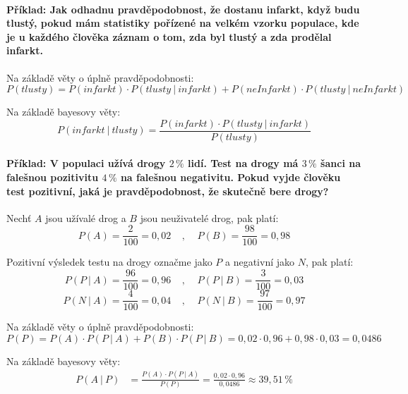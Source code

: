 \paragraph*{Příklad: Jak odhadnu pravděpodobnost, že dostanu infarkt, když budu tlustý, pokud mám statistiky pořízené na velkém vzorku populace, kde je u každého člověka záznam o tom, zda byl tlustý a zda prodělal infarkt.}

\begin{compactitem}
    \item Na základě věty o úplně pravděpodobnosti:
    $$ P(tlusty) = P(infarkt) \cdot P(tlusty ~|~ infarkt) + P(neInfarkt) \cdot P(tlusty ~|~ neInfarkt)$$

    \item Na základě bayesovy věty:
    $$ P(infarkt ~|~ tlusty) = \frac{P(infarkt) \cdot P(tlusty ~|~ infarkt)}{P(tlusty)} $$
\end{compactitem}

\paragraph*{Příklad: V populaci užívá drogy $2\,\%$ lidí. Test na drogy má $3\,\%$ šanci na falešnou pozitivitu $4\,\%$ na falešnou negativitu. Pokud vyjde člověku test pozitivní, jaká je pravděpodobnost, že skutečně bere drogy?}

\begin{compactitem}
    \item Nechť $A$ jsou užívalé drog a $B$ jsou neuživatelé drog, pak platí:
    $$ P(A) = \frac{2}{100} = 0,02 ~~~~~,~~~~~ P(B) = \frac{98}{100} = 0,98$$

    \item Pozitivní výsledek testu na drogy označme jako $P$ a negativní jako $N$, pak platí:
    $$ P(P ~|~ A) = \frac{96}{100} = 0,96 ~~~~~,~~~~~ P(P ~|~ B) = \frac{3}{100} = 0,03 $$
    $$ P(N ~|~ A) = \frac{4}{100} = 0,04 ~~~~~,~~~~~ P(N ~|~ B) = \frac{97}{100} = 0,97 $$

    \item Na základě věty o úplně pravděpodobnosti:
    $$ P(P) = P(A) \cdot P(P~|~A) + P(B) \cdot P(P~|~B) = 0,02 \cdot 0,96 + 0,98 \cdot 0,03 = 0,0486 $$

    \item Na základě bayesovy věty:
    \begin{equation}
        \begin{split}
            P(A ~|~ P) &= \frac{ P(A) \cdot P(P ~|~ A) }{P(P)} = \frac{ 0,02 \cdot 0,96 }{0,0486} \approx 39,51\,\%
        \end{split}
    \end{equation}
\end{compactitem}

